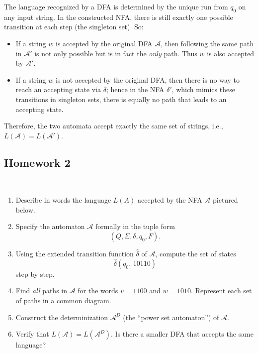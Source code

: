 \documentclass{article}
\theoremstyle{theorem}
\theoremstyle{definition}
\theoremstyle{remark}
\begin{document}
The language recognized by a DFA is determined by the unique run from $q_0$ on any input string. In the constructed NFA, there is still exactly one possible transition at each step (the singleton set). So:
\begin{itemize}
\item If a string $w$ is accepted by the original DFA $\mathcal{A}$, then following the same path in $\mathcal{A}'$ is not only possible but is in fact the \emph{only} path. Thus $w$ is also accepted by $\mathcal{A}'$.
\item If a string $w$ is not accepted by the original DFA, then there is no way to reach an accepting state via $\delta$; hence in the NFA $\delta'$, which mimics these transitions in singleton sets, there is equally no path that leads to an accepting state.
\end{itemize}
Therefore, the two automata accept exactly the same set of strings, i.e., $L(\mathcal{A}) = L(\mathcal{A}')$.

\subsection{Homework 2}\\

\begin{enumerate}

\item Describe in words the language $L(A)$ accepted by the NFA $\mathcal{A}$ pictured below.


\item Specify the automaton $\mathcal{A}$ formally in the tuple form 
\[
(Q, \Sigma, \delta, q_0, F).
\]

\item Using the extended transition function $\hat{\delta}$ of $\mathcal{A}$, compute the set of states 
\[
\hat{\delta}(q_0,\,10110)
\]
step by step.

\item Find \emph{all} paths in $\mathcal{A}$ for the words $v = 1100$ and $w = 1010$. Represent each set of paths in a common diagram.

\item Construct the determinization $\mathcal{A}^D$ (the ``power set automaton'') of $\mathcal{A}$.

\item Verify that $L(\mathcal{A}) = L(\mathcal{A}^D)$.  Is there a smaller DFA that accepts the same language?

\end{enumerate}
\end{document}

